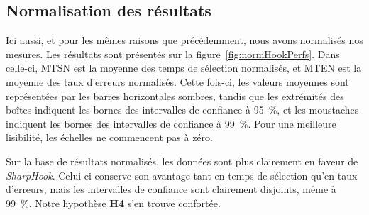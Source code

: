 	\subsection{Normalisation des résultats}
	Ici aussi, et pour les mêmes raisons que précédemment, nous avons normalisés nos mesures. Les résultats sont présentés sur la figure~\ref{fig:normHookPerfs}. Dans celle-ci, MTSN est la moyenne des temps de sélection normalisés, et MTEN est la moyenne des taux d'erreurs normalisés. Cette fois-ci, les valeurs moyennes sont représentées par les barres horizontales sombres, tandis que les extrémités des \og boîtes \fg{} indiquent les bornes des intervalles de confiance à 95~\%{}, et les \og moustaches \fg{} indiquent les bornes des intervalles de confiance à 99~\%{}. Pour une meilleure lisibilité, les échelles ne commencent pas à zéro.
	
	Sur la base de résultats normalisés, les données sont plus clairement en faveur de \emph{SharpHook}. Celui-ci conserve son avantage tant en temps de sélection qu'en taux d'erreurs, mais les intervalles de confiance sont clairement disjoints, même à 99~\%{}. Notre hypothèse \textbf{H4} s'en trouve confortée.


